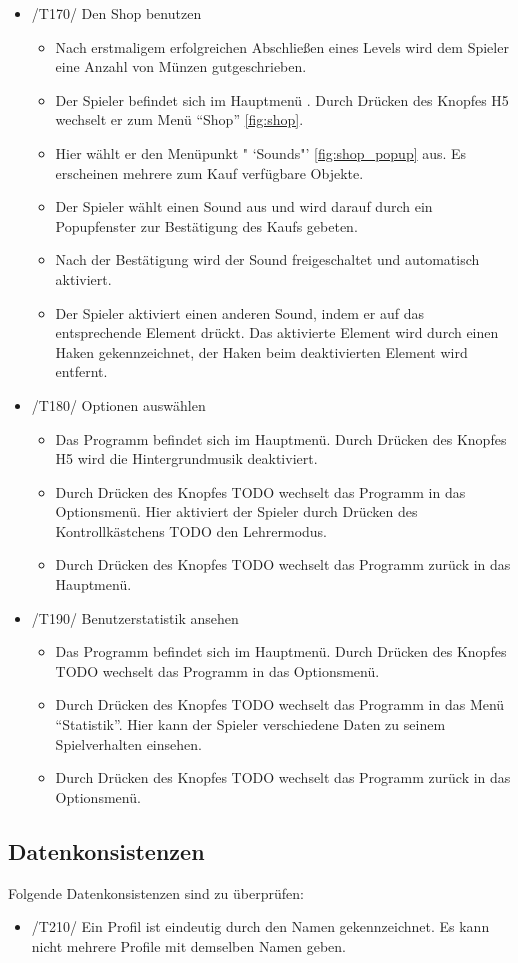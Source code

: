 \begin{itemize}
\item /T170/ Den Shop benutzen
\begin{itemize}
\item Nach erstmaligem erfolgreichen Abschließen eines Levels wird dem Spieler eine Anzahl von Münzen gutgeschrieben.
\item Der Spieler befindet sich im Hauptmenü . Durch Drücken des Knopfes H5 wechselt er zum Menü "`Shop"'  \ref{fig:shop}.
\item Hier wählt er den Menüpunkt " `Sounds"' \ref{fig:shop_popup} aus. Es erscheinen mehrere zum Kauf verfügbare Objekte.
\item Der Spieler wählt einen Sound aus und wird darauf durch ein Popupfenster zur Bestätigung des Kaufs gebeten.
\item Nach der Bestätigung wird der Sound freigeschaltet und automatisch aktiviert.
\item Der Spieler aktiviert einen anderen Sound, indem er auf das entsprechende Element drückt. Das aktivierte Element wird durch einen Haken gekennzeichnet, der Haken beim deaktivierten Element wird entfernt.
\end{itemize}

\item /T180/ Optionen auswählen
\begin{itemize}
\item Das Programm befindet sich im Hauptmenü. Durch Drücken des Knopfes H5 wird die Hintergrundmusik deaktiviert.
\item Durch Drücken des Knopfes TODO wechselt das Programm in das Optionsmenü. Hier aktiviert der Spieler durch Drücken des Kontrollkästchens TODO den Lehrermodus.
\item Durch Drücken des Knopfes TODO wechselt das Programm zurück in das Hauptmenü.
\end{itemize}

\item /T190/ Benutzerstatistik ansehen
\begin{itemize}
\item Das Programm befindet sich im Hauptmenü. Durch Drücken des Knopfes TODO wechselt das Programm in das Optionsmenü.
\item Durch Drücken des Knopfes TODO wechselt das Programm in das Menü "`Statistik"'. Hier kann der Spieler verschiedene Daten zu seinem Spielverhalten einsehen.
\item Durch Drücken des Knopfes TODO wechselt das Programm zurück in das Optionsmenü.
\end{itemize}

\end{itemize}

\subsection{Datenkonsistenzen}
Folgende Datenkonsistenzen sind zu überprüfen:

\begin{itemize}
\item /T210/ Ein Profil ist eindeutig durch den Namen gekennzeichnet. Es kann nicht mehrere Profile mit demselben Namen geben.
\end{itemize}
